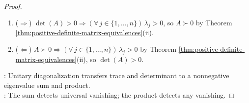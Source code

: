 \begin{proposition}
\begin{proof}
\begin{enumerate}[label=(\roman*)]
\item[$(iv)$] ($\Rightarrow$) $\det(A)>0\Rightarrow(\forall\,j\in\{1,\ldots,n\})\,\lambda_j>0$, so $A\succ0$ by Theorem \ref{thm:positive-definite-matrix-equivalences}(ii).
\item[$(iv)$] ($\Leftarrow$) $A\succ0\Rightarrow(\forall\,j\in\{1,\ldots,n\})\,\lambda_j>0$ by Theorem \ref{thm:positive-definite-matrix-equivalences}(ii), so $\det(A)>0$.
\end{enumerate}
: Unitary diagonalization transfers trace and determinant to a nonnegative eigenvalue sum and product.\\
: The sum detects universal vanishing; the product detects any vanishing.
\end{proof}
\end{proposition}

